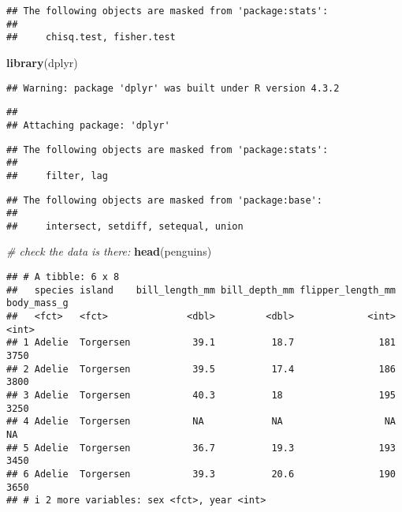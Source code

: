 \documentclass[
]{article}
\newenvironment{Shaded}{\begin{snugshade}}{\end{snugshade}}
\newcommand{\CommentTok}[1]{\textcolor[rgb]{0.56,0.35,0.01}{\textit{#1}}}
\newcommand{\FunctionTok}[1]{\textcolor[rgb]{0.13,0.29,0.53}{\textbf{#1}}}
\newcommand{\NormalTok}[1]{#1}
\begin{document}
\begin{verbatim}
## The following objects are masked from 'package:stats':
## 
##     chisq.test, fisher.test
\end{verbatim}

\begin{Shaded}
\begin{Highlighting}[]
\FunctionTok{library}\NormalTok{(dplyr)}
\end{Highlighting}
\end{Shaded}

\begin{verbatim}
## Warning: package 'dplyr' was built under R version 4.3.2
\end{verbatim}

\begin{verbatim}
## 
## Attaching package: 'dplyr'
\end{verbatim}

\begin{verbatim}
## The following objects are masked from 'package:stats':
## 
##     filter, lag
\end{verbatim}

\begin{verbatim}
## The following objects are masked from 'package:base':
## 
##     intersect, setdiff, setequal, union
\end{verbatim}

\begin{Shaded}
\begin{Highlighting}[]
\CommentTok{\# check the data is there:}
\FunctionTok{head}\NormalTok{(penguins)}
\end{Highlighting}
\end{Shaded}

\begin{verbatim}
## # A tibble: 6 x 8
##   species island    bill_length_mm bill_depth_mm flipper_length_mm body_mass_g
##   <fct>   <fct>              <dbl>         <dbl>             <int>       <int>
## 1 Adelie  Torgersen           39.1          18.7               181        3750
## 2 Adelie  Torgersen           39.5          17.4               186        3800
## 3 Adelie  Torgersen           40.3          18                 195        3250
## 4 Adelie  Torgersen           NA            NA                  NA          NA
## 5 Adelie  Torgersen           36.7          19.3               193        3450
## 6 Adelie  Torgersen           39.3          20.6               190        3650
## # i 2 more variables: sex <fct>, year <int>
\end{verbatim}
\end{document}
